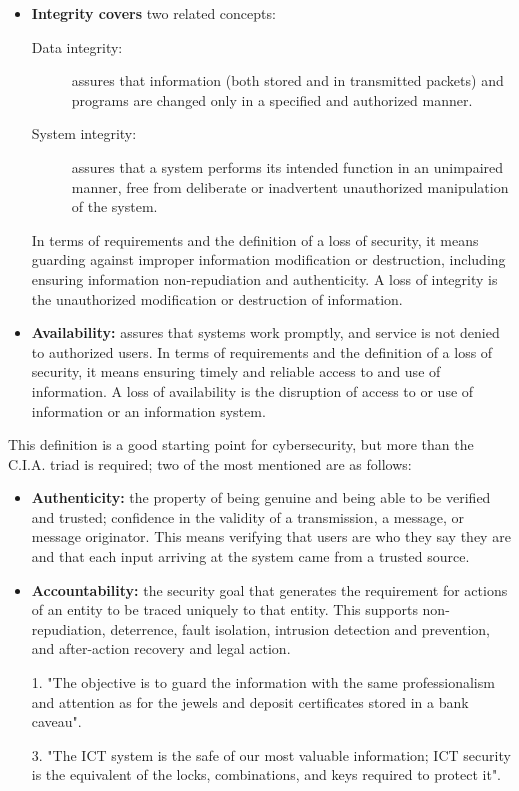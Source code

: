 {\begin{itemize}
    \item \textbf{Integrity covers} two related concepts:
          \begin{description}
            \item [Data integrity:] assures that information (both stored and in transmitted packets) and programs are changed only in a specified and authorized manner.
            \item [System integrity:] assures that a system performs its intended function in an unimpaired manner, free from deliberate or inadvertent unauthorized manipulation of the system.
          \end{description}
          In terms of requirements and the definition of a loss of security, it means guarding against improper information modification or destruction, including ensuring information non-repudiation and authenticity. A loss of integrity is the unauthorized modification or destruction of information.

    \item \textbf{Availability:} assures that systems work promptly, and service is not denied to authorized users. In terms of requirements and the definition of a loss of security, it means ensuring timely and reliable access to and use of information. A loss of availability is the disruption of access to or use of information or an information system.
  \end{itemize}

  This definition is a good starting point for cybersecurity, but more than the C.I.A. triad is required; two of the most mentioned are as follows:

  \begin{itemize}
    \item \textbf{Authenticity:} the property of being genuine and being able to be verified and trusted; confidence in the validity of a transmission, a message, or message originator. This means verifying that users are who they say they are and that each input arriving at the system came from a trusted source.

    \item \textbf{Accountability:} the security goal that generates the requirement for actions of an entity to be traced uniquely to that entity. This supports non-repudiation, deterrence, fault isolation, intrusion detection and prevention, and after-action recovery and legal action.
  \end{itemize}

  \begin{enumerate}
    \item[1.] "The objective is to guard the information with the same professionalism and attention as for the jewels and deposit certificates stored in a bank caveau".
    \item[3.] "The ICT system is the safe of our most valuable information; ICT security is the equivalent of the locks, combinations, and keys required to protect it".
  \end{enumerate}

}{}



